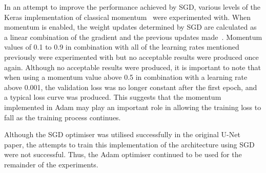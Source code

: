 In an attempt to improve the performance achieved by SGD, various levels of the Keras implementation of classical momentum~\cite{polyak} were experimented with. When momentum is enabled, the weight updates determined by SGD are calculated as a linear combination of the gradient and the previous updates made~\cite{momentum}. Momentum values of 0.1 to 0.9 in combination with all of the learning rates mentioned previously were experimented with but no acceptable results were produced once again. Although no acceptable results were produced, it is important to note that when using a momentum value above 0.5 in combination with a learning rate above 0.001, the validation loss was no longer constant after the first epoch, and a typical loss curve was produced. This suggests that the momentum implemented in Adam may play an important role in allowing the training loss to fall as the training process continues.

Although the SGD optimiser was utilised successfully in the original U-Net paper, the attempts to train this implementation of the architecture using SGD were not successful. Thus, the Adam optimiser continued to be used for the remainder of the experiments.

